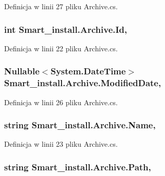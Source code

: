 Definicja w linii 27 pliku Archive.\+cs.

\hypertarget{class_smart__install_1_1_archive_afd080039becc9c704f1d4d2cd8e590f3}{
\subsubsection[{Id}]{\setlength{\rightskip}{0pt plus 5cm}int Smart\+\_\+install.\+Archive.\+Id\hspace{0.3cm}{\ttfamily [get]}, {\ttfamily [set]}}}\label{class_smart__install_1_1_archive_afd080039becc9c704f1d4d2cd8e590f3}


Definicja w linii 22 pliku Archive.\+cs.

\hypertarget{class_smart__install_1_1_archive_abd1dc9feb078ec7db9e3f63fef8a3db6}{
\subsubsection[{Modified\+Date}]{\setlength{\rightskip}{0pt plus 5cm}Nullable$<$System.\+Date\+Time$>$ Smart\+\_\+install.\+Archive.\+Modified\+Date\hspace{0.3cm}{\ttfamily [get]}, {\ttfamily [set]}}}\label{class_smart__install_1_1_archive_abd1dc9feb078ec7db9e3f63fef8a3db6}


Definicja w linii 26 pliku Archive.\+cs.

\hypertarget{class_smart__install_1_1_archive_ab2a5b01802980603eac526169f0f4366}{
\subsubsection[{Name}]{\setlength{\rightskip}{0pt plus 5cm}string Smart\+\_\+install.\+Archive.\+Name\hspace{0.3cm}{\ttfamily [get]}, {\ttfamily [set]}}}\label{class_smart__install_1_1_archive_ab2a5b01802980603eac526169f0f4366}


Definicja w linii 23 pliku Archive.\+cs.

\hypertarget{class_smart__install_1_1_archive_a40e8f14a943da30b52300495888eab9a}{
\subsubsection[{Path}]{\setlength{\rightskip}{0pt plus 5cm}string Smart\+\_\+install.\+Archive.\+Path\hspace{0.3cm}{\ttfamily [get]}, {\ttfamily [set]}}}\label{class_smart__install_1_1_archive_a40e8f14a943da30b52300495888eab9a}


